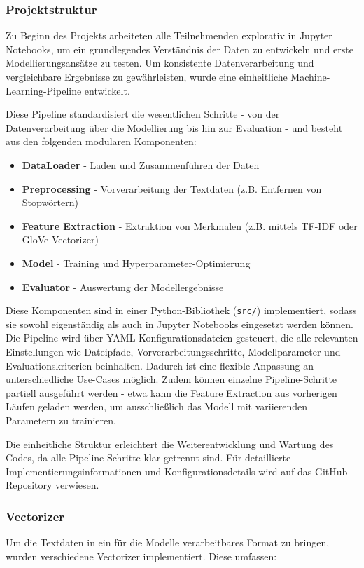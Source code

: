 \subsubsection{Projektstruktur}
Zu Beginn des Projekts arbeiteten alle Teilnehmenden explorativ in Jupyter Notebooks, um ein grundlegendes Verständnis der Daten zu entwickeln und erste Modellierungsansätze zu testen. Um konsistente Datenverarbeitung und vergleichbare Ergebnisse zu gewährleisten, wurde eine einheitliche Machine-Learning-Pipeline entwickelt.

Diese Pipeline standardisiert die wesentlichen Schritte - von der Datenverarbeitung über die Modellierung bis hin zur Evaluation - und besteht aus den folgenden modularen Komponenten:

\begin{itemize}
    \item \textbf{DataLoader} - Laden und Zusammenführen der Daten
    \item \textbf{Preprocessing} - Vorverarbeitung der Textdaten (z.B. Entfernen von Stopwörtern)
    \item \textbf{Feature Extraction} - Extraktion von Merkmalen (z.B. mittels TF-IDF oder GloVe-Vectorizer)
    \item \textbf{Model} - Training und Hyperparameter-Optimierung
    \item \textbf{Evaluator} - Auswertung der Modellergebnisse
\end{itemize}

Diese Komponenten sind in einer Python-Bibliothek (\texttt{src/}) implementiert, sodass sie sowohl eigenständig als auch in Jupyter Notebooks eingesetzt werden können. Die Pipeline wird über YAML-Konfigurationsdateien gesteuert, die alle relevanten Einstellungen wie Dateipfade, Vorverarbeitungsschritte, Modellparameter und Evaluationskriterien beinhalten. Dadurch ist eine flexible Anpassung an unterschiedliche Use-Cases möglich. Zudem können einzelne Pipeline-Schritte partiell ausgeführt werden - etwa kann die Feature Extraction aus vorherigen Läufen geladen werden, um ausschließlich das Modell mit variierenden Parametern zu trainieren.

Die einheitliche Struktur erleichtert die Weiterentwicklung und Wartung des Codes, da alle Pipeline-Schritte klar getrennt sind. Für detaillierte Implementierungsinformationen und Konfigurationsdetails wird auf das GitHub-Repository verwiesen.

\subsubsection{Vectorizer}
Um die Textdaten in ein für die Modelle verarbeitbares Format zu bringen, wurden verschiedene Vectorizer implementiert. Diese umfassen:

